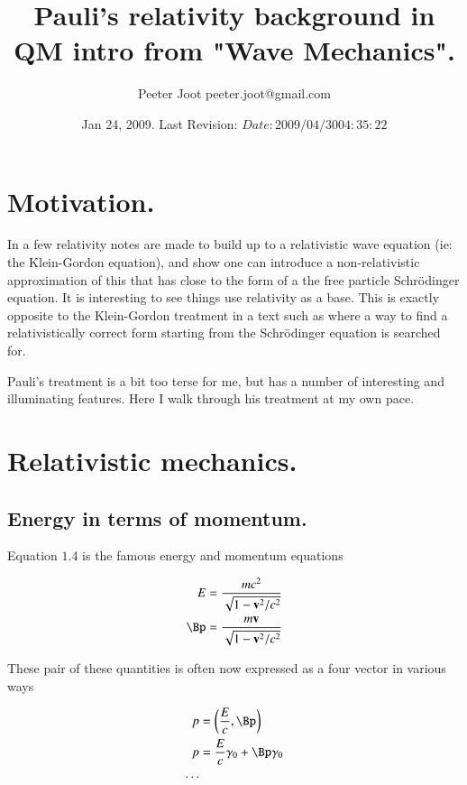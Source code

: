 \documentclass{article}
\title{ Pauli's relativity background in QM intro from "Wave Mechanics". }
\author{Peeter Joot \quad peeter.joot@gmail.com}
\date{ Jan 24, 2009.  Last Revision: $Date: 2009/04/30 04:35:22 $ }
\newcommand{\Sch}[0]{{Schr\"{o}dinger} }
\begin{document}
\maketitle{}

\tableofcontents

\section{ Motivation. }

In \cite{pauli2000wm} a few relativity notes are made to build up to 
a relativistic wave equation (ie: the Klein-Gordon equation),
and show one can introduce a non-relativistic approximation of this
that has close to the form of a the free particle \Sch equation.  It 
is interesting to see things use relativity as a base.  This is exactly
opposite to the Klein-Gordon treatment in a text such as
\cite{srednicki2007qft} where a way to find a 
relativistically correct form starting from the \Sch equation is searched for.

Pauli's treatment is a bit too terse for me, but has a number of
interesting and illuminating features.  Here I walk through his treatment
at my own pace.

\section{ Relativistic mechanics. }

\subsection{ Energy in terms of momentum. }

Equation $1.4$ is the famous energy and momentum equations

\begin{align}\label{eqn:p1_4}
E &= \frac{ m c^2 }{\sqrt{1 - \Bv^2/c^2}} \\
\Bp &= \frac{ m \Bv }{\sqrt{1 - \Bv^2/c^2}} \\
\end{align}

These pair of these quantities is often now expressed as a four vector in various ways

\begin{align*}
p &= \left(\frac{E}{c}, \Bp \right) \\
p &= \frac{E}{c} \gamma_0 + \Bp \gamma_0 \\
\cdots
\end{align*}
\end{document}

